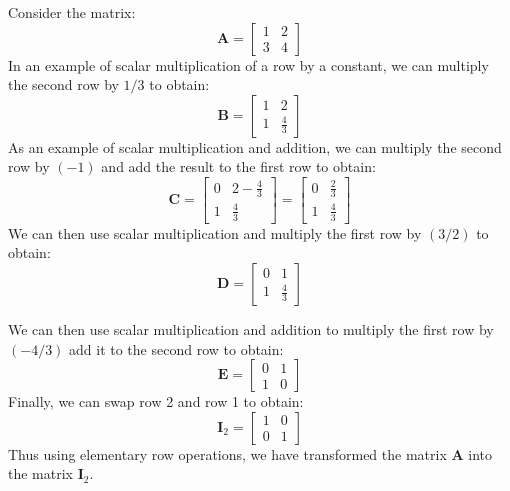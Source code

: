 \begin{example} Consider the matrix:
\begin{displaymath}
\mathbf{A} = 
\begin{bmatrix}
1 & 2\\
3 & 4
\end{bmatrix}
\end{displaymath}
In an example of scalar multiplication of a row by a constant, we can multiply the second row by $1/3$ to obtain:
\begin{displaymath}
\mathbf{B} = 
\begin{bmatrix}
1 & 2\\
1 & \frac{4}{3}
\end{bmatrix}
\end{displaymath}
As an example of scalar multiplication and addition, we can multiply the second row by $(-1)$ and add the result to the first row to obtain:
\begin{displaymath}
\mathbf{C} = 
\begin{bmatrix}
0 & 2-\frac{4}{3}\\
1 & \frac{4}{3}
\end{bmatrix} = 
\begin{bmatrix}
0 & \frac{2}{3}\\
1 & \frac{4}{3}
\end{bmatrix}
\end{displaymath}
We can then use scalar multiplication and multiply the first row by $(3/2)$ to obtain:
\begin{displaymath}
\mathbf{D} = 
\begin{bmatrix}
0 & 1\\
1 & \frac{4}{3}
\end{bmatrix}
\end{displaymath}

We can then use scalar multiplication and addition to multiply the first row by $(-4/3)$ add it to the second row to obtain:
\begin{displaymath}
\mathbf{E} = 
\begin{bmatrix}
0 & 1\\
1 & 0
\end{bmatrix}
\end{displaymath}
Finally, we can swap row 2 and row 1 to obtain:
\begin{displaymath}
\mathbf{I}_2 = 
\begin{bmatrix}
1 & 0\\
0 & 1
\end{bmatrix}
\end{displaymath}
Thus using elementary row operations, we have transformed the matrix $\mathbf{A}$ into the matrix $\mathbf{I}_2$.
\label{ex:ElemRowOps}
\end{example}

